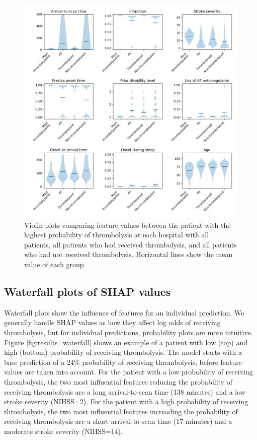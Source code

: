 \begin{figure}
\centering
\includegraphics[width=1.0\textwidth]{./images/02a_most_thrombolsyable_violin}
\caption{Violin plots comparing feature values between the patient with the highest probability of thrombolysis at each hospital with all patients, all patients who had received thrombolysis, and all patients who had not received thrombolysis. Horizontal lines show the mean value of each group.}
\label{fig:results_most_thrombolysable}
\end{figure}


\subsection{Waterfall plots of SHAP values}

Waterfall plots show the influence of features for an individual prediction. We generally handle SHAP values as how they affect log odds of receiving thrombolysis, but for individual predictions, probability plots are more intuitive. Figure \ref{fig:results_waterfall} shows an example of a patient with low (top) and high (bottom) probability of receiving thrombolysis. The model starts with a base prediction of a 24\% probability of receiving thrombolysis, before feature values are taken into account. For the patient with a low probability of receiving thrombolysis, the two most influential features reducing the probability of receiving thrombolysis are a long arrival-to-scan time (138 minutes) and a low stroke severity (NIHSS=2). For the patient with a high probability of receiving thrombolysis, the two most influential features increading the probability of receiving thrombolysis are a short arrival-to-scan time (17 minutes) and a moderate stroke severity (NIHSS=14). 

